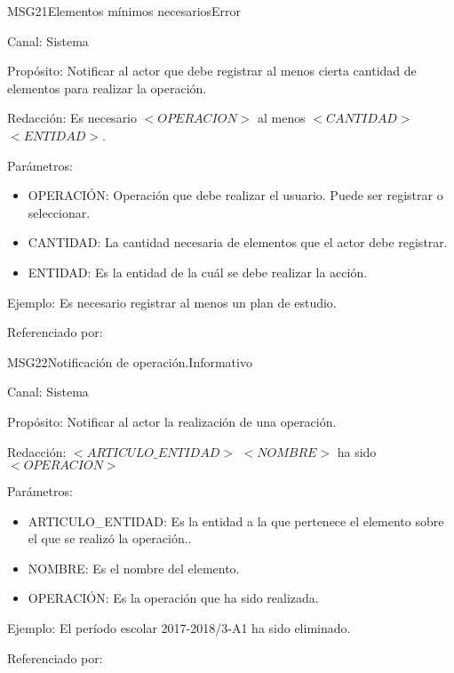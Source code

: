 \begin{mensaje}{MSG21}{Elementos mínimos necesarios}{Error}
	\item[Canal:] Sistema
	\item[Propósito:] Notificar al actor que debe registrar al menos cierta cantidad de elementos para realizar la operación.
	\item[Redacción:] Es necesario $<OPERACION>$ al menos $<CANTIDAD>$ $<ENTIDAD>$.
	\item[Parámetros:] 
	\begin{itemize}
		\item OPERACIÓN: Operación que debe realizar el usuario. Puede ser registrar o seleccionar.
		\item CANTIDAD: La cantidad necesaria de elementos que el actor debe registrar.
		\item ENTIDAD: Es la entidad de la cuál se debe realizar la acción.
	\end{itemize}
	\item[Ejemplo:]  Es necesario registrar al menos un plan de estudio.
	\item[Referenciado por: ] 
\end{mensaje}


\begin{mensaje}{MSG22}{Notificación de operación.}{Informativo}
	\item[Canal:] Sistema
	\item[Propósito:] Notificar al actor la realización de una operación.
	\item[Redacción:] $<ARTICULO\_ENTIDAD>$ $<NOMBRE>$ ha sido $<OPERACION>$
	\item[Parámetros:] 
	\begin{itemize}
		\item ARTICULO\_ENTIDAD: Es la entidad a la que pertenece el elemento sobre el que se realizó la operación..
		\item NOMBRE: Es el nombre del elemento.
		\item OPERACIÓN: Es la operación que ha sido realizada.
	\end{itemize}
	\item[Ejemplo:] El período escolar 2017-2018/3-A1 ha sido eliminado.
	\item[Referenciado por: ] 
\end{mensaje}

